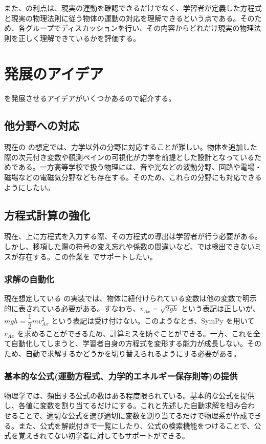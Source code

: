 また、\simname の利点は、現実の運動を確認できるだけでなく、学習者が定義した方程式と現実の物理法則に従う物体の運動の対応を理解できるという点である。そのため、各グループでディスカッションを行い、その内容からどれだけ現実の物理法則を正しく理解できているかを評価する。


\clearpage
\section{発展のアイデア}

\simname を発展させるアイデアがいくつかあるので紹介する。

\subsection{他分野への対応}

現在の \simname の想定では、力学以外の分野に対応することが難しい。物体を追加した際の次元付き変数や観測ペインの可視化が力学を前提とした設計となっているためである。一方高等学校で扱う物理には、音や光などの波動分野、回路や電場・磁場などの電磁気分野なども存在する。そのため、これらの分野にも対応できるようにしたい。

\subsection{方程式計算の強化}

現在、\simname 上に方程式を入力する際、その方程式の導出は学習者が行う必要がある。しかし、移項した際の符号の変え忘れや係数の間違いなど、\simname では検出できないミスが存在する。この作業を \simname でサポートしたい。

\subsubsection*{求解の自動化}
現在想定している \simname の実装では、物体に紐付けられている変数は他の変数で明示的に表されている必要がある。すなわち、$v_{Ax} = \sqrt{2gh}$ という表記は正しいが、$mgh = \dfrac{1}{2}mv_{Ax}^2$ という表記は受け付けない。このようなとき、SymPy を用いて $v_{Ax}$ を求めることができるため、計算ミスを防ぐことができる。一方、これを全て自動化してしまうと、学習者自身の方程式を変形する能力が成長しない。そのため、自動で求解するかどうかを切り替えられるようにする必要がある。

\subsubsection*{基本的な公式(運動方程式、力学的エネルギー保存則等)の提供}
物理学では、頻出する公式の数はある程度限られている。基本的な公式を提供し、各値に変数を割り当てるだけにする。これと先述した自動求解を組み合わせることで、適切な公式を選び適切に変数を割り当てるだけで物理系が作成できる。また、公式を解説付きで一覧にしたり、公式の検索機能をつけることで、公式を覚えきれてない初学者に対してもサポートができる。
